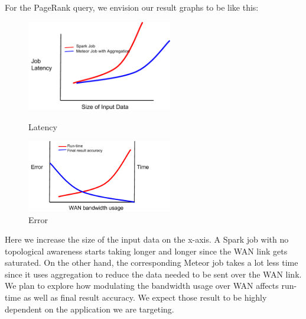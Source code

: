\newpage
For the PageRank query, we envision our result graphs to be like this:

\begin{figure}[ht]
	\centering
	\begin{minipage}[b]{0.48\linewidth}
		\includegraphics[width=2.5in]{figs/fig_1.png}
		\caption{Latency}
		\label{fig:minipage1}
	\end{minipage}
	\quad
	\begin{minipage}[b]{0.48\linewidth}
		\includegraphics[width=2.5in]{figs/fig_2.png}
		\caption{Error}
		\label{fig:minipage2}
	\end{minipage}
\end{figure}

Here we increase the size of the input data on the x-axis. A Spark job with no topological awareness starts taking longer and longer since the WAN link gets saturated. On the other hand, the corresponding Meteor job takes a lot less time since it uses aggregation to reduce the data needed to be sent over the WAN link. We plan to explore how modulating the bandwidth usage over WAN affects run-time as well as final result accuracy. We expect those result to be highly dependent on the application we are targeting.